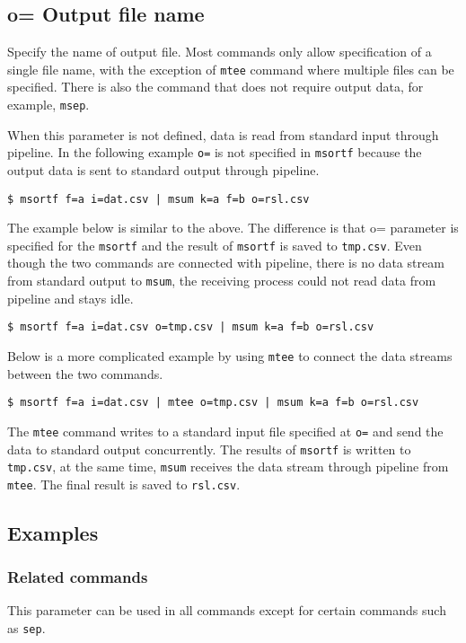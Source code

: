 %

\subsection{o= Output file name\label{sect:option_o}}
Specify the name of output file.
Most commands only allow specification of a single file name, with the exception of \verb|mtee| command where multiple files can be specified. There is also the command that does not require output data, for example, \verb|msep|.

When this parameter is not defined, data is read from standard input through pipeline. 
In the following example \verb|o=| is not specified in \verb|msortf| because the output data is sent to standard output through pipeline.
 
\begin{Verbatim}[baselinestretch=0.7,frame=single]
$ msortf f=a i=dat.csv | msum k=a f=b o=rsl.csv
\end{Verbatim}

The example below is similar to the above. The difference is that o= parameter is specified for the \verb|msortf| and the result of \verb|msortf| is saved to \verb|tmp.csv|. Even though the two commands are connected with pipeline, there is no data stream from standard output to \verb|msum|, the receiving process could not read data from pipeline and stays idle. 
 
\begin{Verbatim}[baselinestretch=0.7,frame=single]
$ msortf f=a i=dat.csv o=tmp.csv | msum k=a f=b o=rsl.csv
\end{Verbatim}

Below is a more complicated example by using \verb|mtee| to connect the data streams between the two commands.

\begin{Verbatim}[baselinestretch=0.7,frame=single]
$ msortf f=a i=dat.csv | mtee o=tmp.csv | msum k=a f=b o=rsl.csv
\end{Verbatim}

The \verb|mtee| command writes to a standard input file specified at \verb|o=| and send the data to standard output concurrently. The results of \verb|msortf| is written to \verb|tmp.csv|, at the same time, \verb|msum| receives the data stream through pipeline from \verb|mtee|. The final result is saved to \verb|rsl.csv|.

\subsection*{Examples}


\subsubsection*{Related commands}
This parameter can be used in all commands except for certain commands such as \verb|sep|.

%

